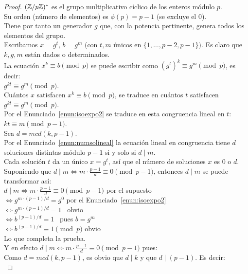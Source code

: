 \begin{proof}
$(\mathbb{Z}/p\mathbb{Z})^*$ es el grupo multiplicativo cíclico de los enteros módulo $p$. \\
Su orden (número de elementos) es $\phi(p)=p-1$ (se excluye el $0$). \\
Tiene por tanto un generador $g$ que, con la potencia pertinente, genera todos los elementos del grupo. \\
Escribamos $x=g^t$, $b=g^m$ (con $t,m$ únicos en $\{1,\dots,p-2,p-1\})$. Es claro que $k,g,m$ están dados o determinados. \\
La ecuación $x^k \equiv b\pmod p$ se puede escribir como $(g^t)^k \equiv g^m \pmod p$, es decir: \\
$g^{kt} \equiv g^m \pmod p$. \\
Cuántos $x$ satisfacen $x^k \equiv b\pmod p$, se traduce en cuántos $t$ satisfacen $g^{kt} \equiv g^m \pmod p$. \\  
Por el Enunciado~\ref{enun:isoexpo2} se traduce en esta congruencia lineal en $t$: \\
$kt \equiv m \pmod {p-1}$. \\
Sea $d = mcd(k,p-1)$. \\ 
Por el Enunciado~\ref{enun:numsolineal} la ecuación lineal en congruencia tiene $d$ soluciones distintas módulo $p-1$ si y solo si $d \mid m$. \\
Cada solución $t$ da un único $x=g^t$, así que el número de soluciones $x$ es $0$ o $d$. \\
Suponiendo que $d\mid m \iff m\cdot\frac{p-1}{d} \equiv 0\pmod {p-1}$, entonces $d \mid m$ se puede transformar así: \\
$d\mid m \iff m\cdot\frac{p-1}{d} \equiv 0\pmod {p-1}$ \quad por el supuesto \\
$\iff g^{m\cdot (p-1)/d}=g^0$ \quad\quad\quad\quad\quad\quad\quad\quad por el Enunciado~\ref{enun:isoexpo2} \\
$\iff g^{m\cdot (p-1)/d}=1$ \quad\quad\quad\quad\quad\quad\quad\quad \, obvio \\
$\iff b^{(p-1)/d}=1$ \quad \quad\quad\quad\quad\quad\quad\quad\quad \, pues $b = g^m$\\
$\iff b^{(p-1)/d}\equiv 1 \pmod p$ \quad\quad\quad\quad\quad obvio \\
Lo que completa la prueba. \\
Y en efecto $d\mid m \iff m\cdot\frac{p-1}{d} \equiv 0\pmod {p-1}$ pues: \\
Como $d = mcd(k,p-1)$, es obvio que $d \mid k$ y que $d \mid (p-1)$. Es decir:\\

\end{proof}
